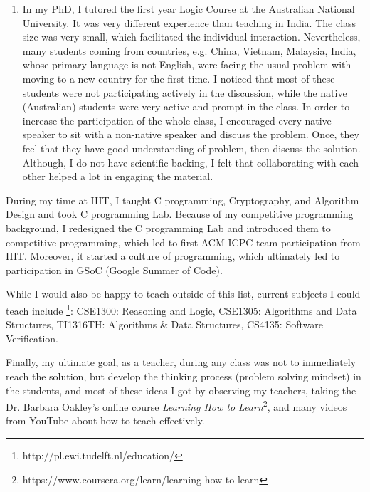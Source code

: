 \documentclass[a4paper]{article}
\begin{document}
\begin{enumerate}
  \item In my PhD, I  tutored the first year Logic Course at the Australian National University. It was very different 
experience than teaching in India.  The class size was very small, which facilitated the individual interaction. 
Nevertheless, many students coming from countries, e.g. China, Vietnam, Malaysia, India, 
whose primary language is not English, were facing the usual problem with moving to a new country 
for the first time. I noticed that most of these students were not participating actively in the discussion, 
while the native (Australian) students 
were very active and prompt in the class.  In order to increase the participation of the whole class, 
I encouraged every  native speaker to sit with a non-native speaker and discuss 
the problem. Once, they feel that they have good understanding of problem, then discuss the solution. Although, I do not 
have scientific backing,  I felt that collaborating with each other helped a lot in engaging the material. 

\end{enumerate}


 During my time at IIIT,  I taught C programming, Cryptography, and Algorithm Design and took C programming Lab.
 Because of my competitive programming background, I redesigned the C programming Lab and introduced them to 
 competitive programming, which led to first ACM-ICPC team participation from IIIT. Moreover, it started a culture 
 of programming, which ultimately led to participation in GSoC (Google Summer of Code). 


While I would also be happy to teach outside of this list, current subjects I could teach include \footnote{http://pl.ewi.tudelft.nl/education/}:
CSE1300: Reasoning and Logic, CSE1305: Algorithms and Data Structures,  TI1316TH: Algorithms \& Data Structures, CS4135: Software Verification.

Finally, my ultimate goal, as a teacher, during any class was not to immediately reach the solution, but develop the 
thinking process (problem solving mindset) in the students, and most of these ideas I got  by observing my teachers, 
taking the Dr. Barbara Oakley's online course \textit{Learning How to Learn}\footnote{https://www.coursera.org/learn/learning-how-to-learn},
and many videos from YouTube about how to teach effectively. 
\end{document}
